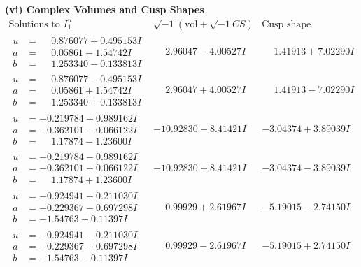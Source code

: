 \documentclass[1p]{elsarticle_modified}
\theoremstyle{definition}
\newcommand{\I}{\sqrt{-1}}
\begin{document}
\newpage\flushleft \textbf{(vi) Complex Volumes and Cusp Shapes}
$$\begin{array}{c|c|c}  
\text{Solutions to }I^u_{1}& \I (\text{vol} + \sqrt{-1}CS) & \text{Cusp shape}\\
 \hline 
\begin{aligned}
u &= \phantom{-}0.876077 + 0.495153 I \\
a &= \phantom{-}0.05861 - 1.54742 I \\
b &= \phantom{-}1.253340 - 0.133813 I\end{aligned}
 & \phantom{-}2.96047 - 4.00527 I & \phantom{-}1.41913 + 7.02290 I \\ \hline\begin{aligned}
u &= \phantom{-}0.876077 - 0.495153 I \\
a &= \phantom{-}0.05861 + 1.54742 I \\
b &= \phantom{-}1.253340 + 0.133813 I\end{aligned}
 & \phantom{-}2.96047 + 4.00527 I & \phantom{-}1.41913 - 7.02290 I \\ \hline\begin{aligned}
u &= -0.219784 + 0.989162 I \\
a &= -0.362101 - 0.066122 I \\
b &= \phantom{-}1.17874 - 1.23600 I\end{aligned}
 & -10.92830 - 8.41421 I & -3.04374 + 3.89039 I \\ \hline\begin{aligned}
u &= -0.219784 - 0.989162 I \\
a &= -0.362101 + 0.066122 I \\
b &= \phantom{-}1.17874 + 1.23600 I\end{aligned}
 & -10.92830 + 8.41421 I & -3.04374 - 3.89039 I \\ \hline\begin{aligned}
u &= -0.924941 + 0.211030 I \\
a &= -0.229367 - 0.697298 I \\
b &= -1.54763 + 0.11397 I\end{aligned}
 & \phantom{-}0.99929 + 2.61967 I & -5.19015 - 2.74150 I \\ \hline\begin{aligned}
u &= -0.924941 - 0.211030 I \\
a &= -0.229367 + 0.697298 I \\
b &= -1.54763 - 0.11397 I\end{aligned}
 & \phantom{-}0.99929 - 2.61967 I & -5.19015 + 2.74150 I \\ \hline\begin{aligned}

\end{aligned}
\end{array}$$
\end{document}
